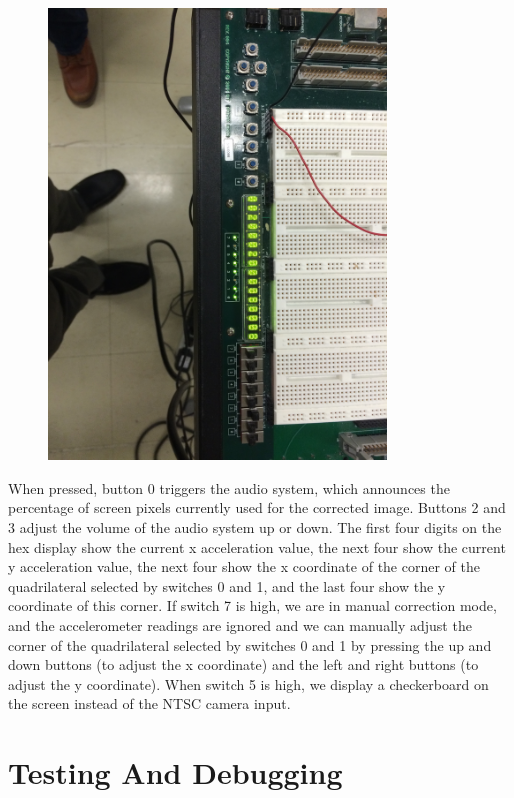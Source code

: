 \documentclass{article}
\begin{document}
\begin{center}
\begin{figure}[H]
\includegraphics[width=0.8\textwidth, angle=90]{./img/ui}
\end{figure}
\end{center}
When pressed, button 0 triggers the audio system, which announces the percentage of screen pixels currently used for the corrected image. Buttons 2 and 3 adjust the volume of the audio system up or down. The first four digits on the hex display show the current x acceleration value, the next four show the current y acceleration value, the next four show the x coordinate of the corner of the quadrilateral selected by switches 0 and 1, and the last four show the y coordinate of this corner. If switch 7 is high, we are in manual correction mode, and the accelerometer readings are ignored and we can manually adjust the corner of the quadrilateral selected by switches 0 and 1 by pressing the up and down buttons (to adjust the x coordinate) and the left and right buttons (to adjust the y coordinate). When switch 5 is high, we display a checkerboard on the screen instead of the NTSC camera input.

\section{Testing And Debugging}
\end{document}
